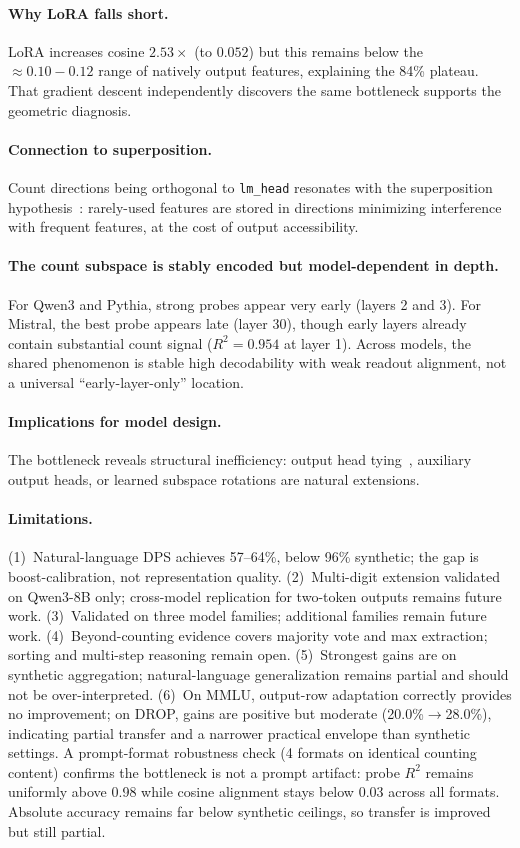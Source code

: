 \documentclass{article}
\begin{document}
\paragraph{Why LoRA falls short.}
LoRA increases cosine $2.53\times$ (to $0.052$) but this remains below the $\approx 0.10{-}0.12$ range of natively output features, explaining the 84\% plateau.
That gradient descent independently discovers the same bottleneck supports the geometric diagnosis.

\paragraph{Connection to superposition.}
Count directions being orthogonal to \texttt{lm\_head} resonates with the superposition hypothesis~\citep{elhage2022superposition}: rarely-used features are stored in directions minimizing interference with frequent features, at the cost of output accessibility.

\paragraph{The count subspace is stably encoded but model-dependent in depth.}
For Qwen3 and Pythia, strong probes appear very early (layers 2 and 3).
For Mistral, the best probe appears late (layer 30), though early layers already
contain substantial count signal ($R^2 = 0.954$ at layer 1).
Across models, the shared phenomenon is stable high decodability with weak readout alignment,
not a universal ``early-layer-only'' location.

\paragraph{Implications for model design.}
The bottleneck reveals structural inefficiency: output head tying~\citep{press2017using}, auxiliary output heads, or learned subspace rotations are natural extensions.

\paragraph{Limitations.}
(1)~Natural-language DPS achieves 57--64\%, below 96\% synthetic; the gap is boost-calibration, not representation quality.
(2)~Multi-digit extension validated on Qwen3-8B only; cross-model replication for two-token outputs remains future work.
(3)~Validated on three model families; additional families remain future work.
(4)~Beyond-counting evidence covers majority vote and max extraction; sorting and multi-step reasoning remain open.
(5)~Strongest gains are on synthetic aggregation; natural-language generalization remains partial and should not be over-interpreted.
(6)~On MMLU, output-row adaptation correctly provides no improvement; on DROP, gains are positive but moderate (20.0\%$\to$28.0\%), indicating partial transfer and a narrower practical envelope than synthetic settings.
A prompt-format robustness check (4 formats on identical counting content) confirms the bottleneck is not a prompt artifact: probe $R^2$ remains uniformly above 0.98 while cosine alignment stays below 0.03 across all formats.
Absolute accuracy remains far below synthetic ceilings, so transfer is improved but still partial.
\end{document}
